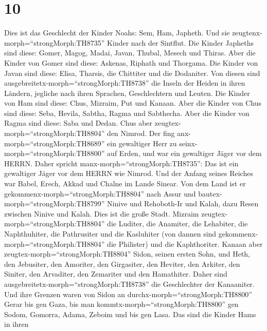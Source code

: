 \hypertarget{section-9}{%
\section{10}\label{section-9}}

 Dies ist das Geschlecht der Kinder Noahs: Sem, Ham,
Japheth. Und sie zeugtenx-morph=``strongMorph:TH8735'' Kinder nach der
Sintflut.  Die Kinder Japheths sind diese: Gomer, Magog,
Madai, Javan, Thubal, Mesech und Thiras.  Aber die Kinder
von Gomer sind diese: Askenas, Riphath und Thorgama.  Die
Kinder von Javan sind diese: Elisa, Tharsis, die Chittiter und die
Dodaniter.  Von diesen sind
ausgebreitetx-morph=``strongMorph:TH8738'' die Inseln der Heiden in
ihren Ländern, jegliche nach ihren Sprachen, Geschlechtern und Leuten.
 Die Kinder von Ham sind diese: Chus, Mizraim, Put und
Kanaan.  Aber die Kinder von Chus sind diese: Seba, Hevila,
Sabtha, Ragma und Sabthecha. Aber die Kinder von Ragma sind diese: Saba
und Dedan.  Chus aber zeugtex-morph=``strongMorph:TH8804''
den Nimrod. Der fing anx-morph=``strongMorph:TH8689'' ein gewaltiger
Herr zu seinx-morph=``strongMorph:TH8800'' auf Erden,  und
war ein gewaltiger Jäger vor dem HERRN. Daher spricht
manx-morph=``strongMorph:TH8735'': Das ist ein gewaltiger Jäger vor dem
HERRN wie Nimrod.  Und der Anfang seines Reiches war Babel,
Erech, Akkad und Chalne im Lande Sinear.  Von dem Land ist
er gekommenx-morph=``strongMorph:TH8804'' nach Assur und
bautex-morph=``strongMorph:TH8799'' Ninive und Rehoboth-Ir und Kalah,
 dazu Resen zwischen Ninive und Kalah. Dies ist die große
Stadt.  Mizraim zeugtex-morph=``strongMorph:TH8804'' die
Luditer, die Anamiter, die Lehabiter, die Naphthuhiter, 
die Pathrusiter und die Kasluhiter (von dannen sind
gekommenx-morph=``strongMorph:TH8804'' die Philister) und die
Kaphthoriter.  Kanaan aber
zeugtex-morph=``strongMorph:TH8804'' Sidon, seinen ersten Sohn, und
Heth,  den Jebusiter, den Amoriter, den Girgasiter,
 den Heviter, den Arkiter, den Siniter,  den
Arvaditer, den Zemariter und den Hamathiter. Daher sind
ausgebreitetx-morph=``strongMorph:TH8738'' die Geschlechter der
Kanaaniter.  Und ihre Grenzen waren von Sidon an
durchx-morph=``strongMorph:TH8800'' Gerar bis gen Gaza, bis man
kommtx-morph=``strongMorph:TH8800'' gen Sodom, Gomorra, Adama, Zeboim
und bis gen Lasa.  Das sind die Kinder Hams in ihren
